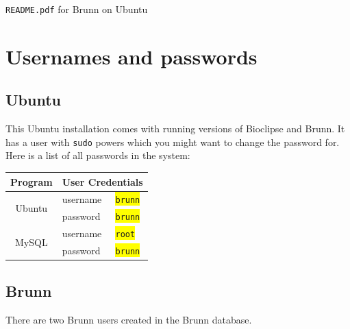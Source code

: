 \documentclass[12pt, a4paper, twoside, openany]{article}
\begin{document}
    \allsectionsfont{\sffamily}

    \setlength{\parindent}{0 em}
    \setlength{\parskip}{1.5 ex plus 1 ex minus 1 ex}

    \LARGE 
    \begin{center}
        \texttt{README.pdf} \textsf{for Brunn on Ubuntu}
    \end{center}
    \normalsize

    \tableofcontents

    \newpage

    \section{Usernames and passwords}
    \subsection*{Ubuntu}
    This Ubuntu installation comes with running versions of Bioclipse and
    Brunn. It has a user with \texttt{sudo} powers which you might want to
    change the password for. Here is a list of all passwords in the system: 

    \begin{center}
        \begin{tabular}{|c|l|l|}
        \hline
        Program & \multicolumn{2}{|c|}{User Credentials} \\
        \hline
        \multirow{2}{*}{Ubuntu} & username 
                                & \colorbox{yellow}{\texttt{brunn}} \\
                                & password 
                                & \colorbox{yellow}{\texttt{brunn}} \\
        \hline
        \multirow{2}{*}{MySQL}  & username 
                                & \colorbox{yellow}{\texttt{root}}  \\
                                & password 
                                & \colorbox{yellow}{\texttt{brunn}} \\
        \hline
        \end{tabular}
    \end{center}

    \subsection*{Brunn}
    There are two Brunn users created in the Brunn database.
\end{document}
